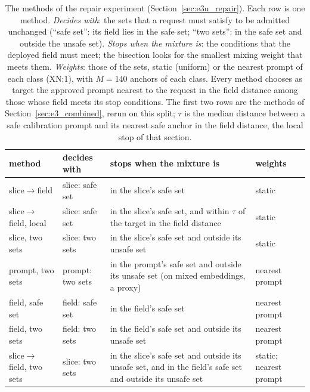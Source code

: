 \documentclass{article}
\theoremstyle{plain}
\theoremstyle{remark}
\begin{document}
\begin{table}[!htbp]
\centering
\caption{The methods of the repair experiment (Section~\ref{sec:e3u_repair}). Each row is one method. \emph{Decides with}: the sets that
a request must satisfy to be admitted unchanged (``safe set'': its field lies in the safe set; ``two sets'': in the safe set and outside
the unsafe set). \emph{Stops when the mixture is}: the conditions that the deployed field must meet; the bisection looks for the smallest
mixing weight that meets them. \emph{Weights}: those of the sets, static (uniform) or the nearest prompt of each class (XN:1), with
$M=140$ anchors of each class. Every method chooses as target the approved prompt nearest to the request in the field distance among those
whose field meets its stop conditions. The first two rows are the methods of Section~\ref{sec:e3_combined}, rerun on this split; $\tau$ is
the median distance between a safe calibration prompt and its nearest safe anchor in the field distance, the local stop of that
section.}
\label{tab:e3u_methods}
\small
\setlength{\tabcolsep}{4pt}
\begin{tabular}{l l p{6.6cm} l}
\toprule
method & decides with & stops when the mixture is & weights\\
\midrule
slice$\to$field & slice: safe set & in the slice's safe set & static\\
slice$\to$field, local & slice: safe set & in the slice's safe set, and within $\tau$ of the target in the field distance & static\\
\midrule
slice, two sets & slice: two sets & in the slice's safe set and outside its unsafe set & static\\
prompt, two sets & prompt: two sets & in the prompt's safe set and outside its unsafe set (on mixed embeddings, a proxy) & nearest prompt\\
field, safe set & field: safe set & in the field's safe set & nearest prompt\\
field, two sets & field: two sets & in the field's safe set and outside its unsafe set & nearest prompt\\
slice$\to$field, two sets & slice: two sets & in the slice's safe set and outside its unsafe set, and in the field's safe set and outside its unsafe set & static; nearest prompt\\
\bottomrule
\end{tabular}
\end{table}
\end{document}
